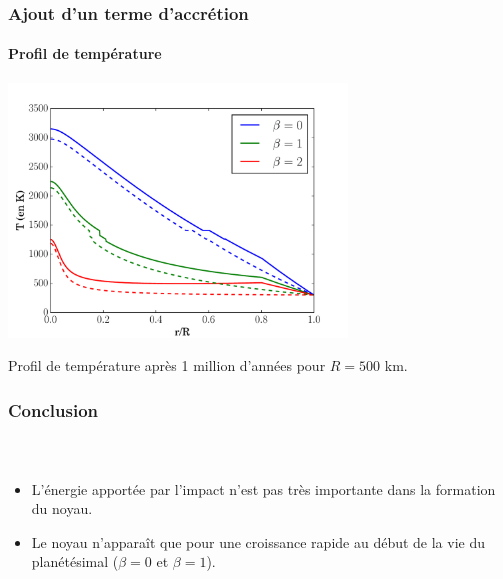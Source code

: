 \documentclass{beamer}
\begin{document}
\begin{frame}
	\frametitle{Ajout d'un terme d'accrétion}
	\framesubtitle{Profil de température}
\vspace{-0.5cm}

\center \includegraphics[width = 9cm]{figures/profil_acre_impact.pdf} 
 
Profil de température après 1 million d'années pour $R = 500$ km.
	  	
\end{frame}

\begin{frame}
	\frametitle{Conclusion}
	\framesubtitle{\ }
	


\begin{itemize}
\item L'énergie apportée par l'impact n'est pas très importante dans la formation du noyau.
\vspace{0.5cm}

\item Le noyau n'apparaît que pour une croissance rapide au début de la vie du planétésimal ($\beta = 0$ et $\beta = 1$).
\end{itemize}




	
\end{frame}
\end{document}
